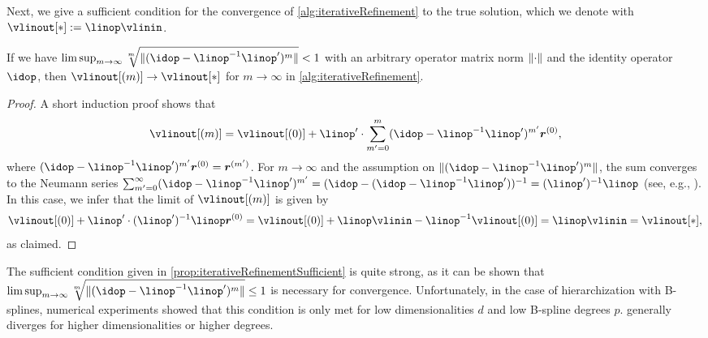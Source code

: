 Next, we give a sufficient condition for the
convergence of \cref{alg:iterativeRefinement} to the true
solution, which we denote with $\vlinout[\ast] := \linop \vlinin$.

\begin{proposition}
  \label{prop:iterativeRefinementSufficient}
  If we have $\limsup_{m \to \infty}
  \sqrt[m]{\norm{(\idop - \linop^{-1} \linop')^m}} < 1$
  with an arbitrary operator matrix norm $\lVert{\cdot}\rVert$ and the
  identity operator $\idop$,
  then $\vlinout[(m)] \to \vlinout[\ast]$ for $m \to \infty$
  in \cref{alg:iterativeRefinement}.
\end{proposition}

\begin{proof}
  A short induction proof shows that
  \begin{equation}
    \label{eq:proofPropIterativeRefinementSufficient}
    \vlinout[(m)]
    = \vlinout[(0)] + \linop' \cdot
    \sum_{m'=0}^m (\idop - \linop^{-1} \linop')^{m'} \*r^{(0)},
  \end{equation}
  where $(\idop - \linop^{-1} \linop')^{m'} \*r^{(0)} = \*r^{(m')}$.
  For $m \to \infty$ and the assumption on
  $\norm{(\idop - \linop^{-1} \linop')^m}$,
  the sum converges to the Neumann series
  $\sum_{m'=0}^\infty (\idop - \linop^{-1} \linop')^{m'}
  = (\idop - (\idop - \linop^{-1} \linop'))^{-1} = (\linop')^{-1} \linop$
  (see, e.g., \cite{Werner11Funktionalanalysis}).
  In this case, we infer that the limit of $\vlinout[(m)]$ is given by
  \begin{equation}
    \vlinout[(0)] + \linop' \cdot (\linop')^{-1} \linop \*r^{(0)}
    = \vlinout[(0)] + \linop \vlinin - \linop^{-1} \vlinout[(0)]
    = \linop \vlinin
    = \vlinout[\ast],
  \end{equation}
  as claimed.
\end{proof}

The sufficient condition given in \cref{prop:iterativeRefinementSufficient}
is quite strong, as it can be shown that $\limsup_{m \to \infty}
\sqrt[m]{\norm{(\idop - \linop^{-1} \linop')^m}} \le 1$ is necessary for
convergence.
Unfortunately, in the case of hierarchization with B-splines,
numerical experiments showed that
this condition is only met for low dimensionalities $d$ and low
B-spline degrees $p$.
 generally diverges
for higher dimensionalities or higher degrees.



